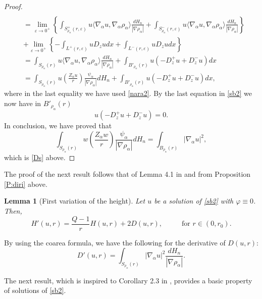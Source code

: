 \documentclass[11pt]{amsart}
\theoremstyle{plain}
\newtheorem{lemma}[thrm]{Lemma}
\numberwithin{equation}{section}
\begin{document}
\begin{proof}
\begin{align*}
\\
& = \underset{{\varepsilon}\to 0^+}{\lim} \left\{\int_{{S^+_{\rho_\alpha}(r,{\varepsilon})}} u \langle{\nabla_\alpha} u,{\nabla_\alpha} \rho_\alpha\rangle \frac{dH_{n}}{|\nabla {\rho_\alpha}|}+ \int_{{S^-_{\rho_\alpha}(r,{\varepsilon})}} u \langle{\nabla_\alpha} u,{\nabla_\alpha} \rho_\alpha\rangle \frac{dH_{n}}{|\nabla {\rho_\alpha}|}\right\}
\\
& + \underset{{\varepsilon}\to 0^+}{\lim} \left\{- \int_{{L^+(r,{\varepsilon})}} u D_z u dx + \int_{{L^-(r,{\varepsilon})}} u D_z u dx\right\}
\\
& = \int_{{S_{\rho_\alpha}(r)}} u \langle{\nabla_\alpha} u,{\nabla_\alpha} \rho_\alpha\rangle \frac{dH_{n}}{|\nabla {\rho_\alpha}|} + \int_{{B'_{\rho_\alpha}(r)}} u(-D^+_z u + D^-_z u) dx
\\
& = \int_{S_{\rho_\alpha}(r)} u\left(\frac{Z_\alpha u}{r}\right)\frac{\psi_\alpha}{|\nabla {\rho_\alpha}|}dH_{n} + \int_{{B'_{\rho_\alpha}(r)}} u(-D^+_z u + D^-_z u) dx,
\end{align*}
where in the last equality we have used \eqref{nara2}. By the last equation in \eqref{sb2} we now have in $B'_{\rho_\alpha}(r)$
\[
u(-D^+_z u + D^-_z u)  = 0.
\]
In conclusion, we have proved that
\[
\int_{S_{\rho_\alpha}(r)} w\left(\frac{Z_\alpha w}{r}\right)\frac{\psi_\alpha}{|\nabla {\rho_\alpha}|}dH_{n}  = \int_{{B_{\rho_\alpha}(r)}} |{\nabla_\alpha} u|^2,
\]
which is \eqref{Ds} above.

\end{proof}

The proof of the next result follows that of Lemma 4.1 in \cite{G} and from Proposition \ref{P:diri} above.

\begin{lemma}[First variation of the height]\label{l:hprime}
 Let $u$ be a solution of \eqref{sb2} with ${\varphi}\equiv 0$. Then,
 \[
  H'(u,r)=\frac{Q-1}{r}H(u,r)+2D(u,r),\hspace{1cm}\textrm{ for }r\in (0,r_0).
 \]
\end{lemma}

By using the coarea formula, we have the following for the derivative of $D(u,r)$:
\begin{equation}\label{D'u}
 D'(u,r)=\int_{S_{\rho_\alpha}(r)} |\nabla_\alpha u|^2\frac{dH_{n}}{|\nabla{\rho_\alpha}|}.
\end{equation}

The next result, which is inspired to Corollary 2.3 in \cite{G}, provides a basic property of solutions of \eqref{sb2}.
\end{document}
